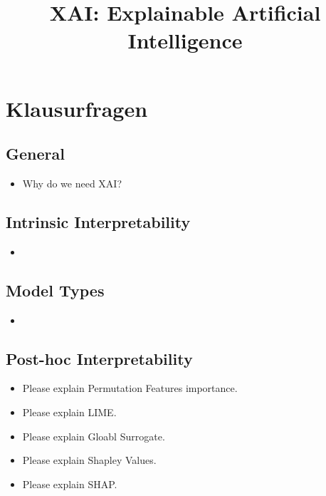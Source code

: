 \documentclass{report}
\title{XAI: Explainable Artificial Intelligence}
\begin{document}
	
	\maketitle
	\newpage
	
	\tableofcontents
	\newpage
	
	\chapter{Klausurfragen}
	
	\section{General}
	
	\begin{itemize}
		\item Why do we need XAI?
	\end{itemize}

	\section{Intrinsic Interpretability}
	
	\begin{itemize}
	\item 
	\end{itemize}

	\section{Model Types}
	
	\begin{itemize}
	\item 
	\end{itemize}

	\section{Post-hoc Interpretability}
	
	\begin{itemize}
	\item Please explain Permutation Features importance.
	\item Please explain LIME.
	\item Please explain Gloabl Surrogate.
	
	\item Please explain Shapley Values.
	\item Please explain SHAP.
	\end{itemize}
	
\end{document}
